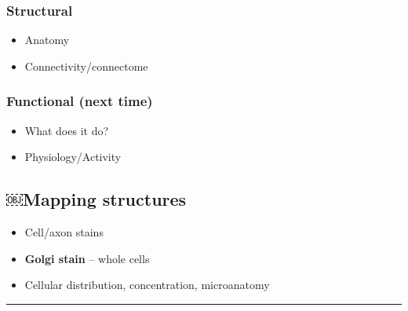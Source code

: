 \documentclass[]{article}
\providecommand{\tightlist}{%
  \setlength{\itemsep}{0pt}\setlength{\parskip}{0pt}}
\begin{document}
\subsubsection{Structural}\label{structural}

\begin{itemize}
\tightlist
\item
  Anatomy
\item
  Connectivity/connectome
\end{itemize}

\subsubsection{Functional (next time)}\label{functional-next-time}

\begin{itemize}
\tightlist
\item
  What does it do?
\item
  Physiology/Activity
\end{itemize}

\subsection{￼Mapping structures}\label{mapping-structures}

\begin{itemize}
\tightlist
\item
  Cell/axon stains
\item
  \textbf{Golgi stain} -- whole cells
\item
  Cellular distribution, concentration, microanatomy
\end{itemize}

\begin{center}\rule{0.5\linewidth}{\linethickness}\end{center}
\end{document}
